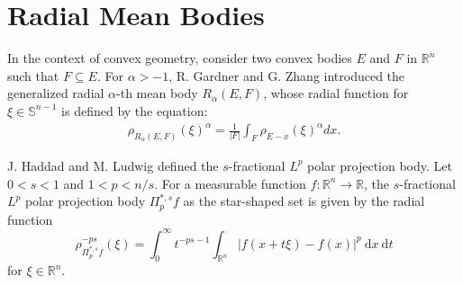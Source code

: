 \documentclass[preprint,12pt]{elsarticle}
\begin{document}
\section{Radial Mean Bodies}\label{6}
In the context of convex geometry, consider two convex bodies $E$ and $F$ in $ \mathbb{R}^n$ such that $F\subseteq E$. For  $\alpha > -1$, R. Gardner and G. Zhang \cite{GZ98} introduced the generalized  radial $\alpha $-th mean body ${R}_{\alpha }(E,F)$, whose radial function for $\xi \in {\mathbb{S}}^{n-1} $ is defined by the equation:
\begin{eqnarray}\label{66}
{{\rho}_{{R}_{\alpha }(E,F)} (\xi)}^{\alpha }=\frac{1}{|F|}\int_{F}{{\rho}_{E-x} (\xi)}^{\alpha }dx.
\end{eqnarray} 

J. Haddad and M. Ludwig \cite{JM2025} defined the $s$-fractional $L^p$ polar projection body.
Let $0<s<1$ and $1<p<n / s$. For a measurable function $f: \mathbb{R}^n \rightarrow \mathbb{R}$, the $s$-fractional $L^p$ polar projection body $\Pi_p^{*, s} f$ as the star-shaped set is given by the radial function
$$
{\rho}_{\Pi_p^{*, s} f}^{-p s}(\xi)=\int_0^{\infty} t^{-p s-1} \int_{\mathbb{R}^n}|f(x+t \xi)-f(x)|^p \mathrm{~d} x \mathrm{~d} t
$$
for $\xi \in \mathbb{R}^n$. 
\end{document}
